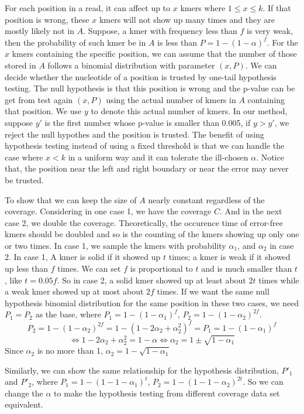 \documentclass[10pt]{article}
\begin{document}
For each position in a read, it can affect up to $x$ kmers where $1\le x\le k$. If that position is wrong, these $x$ kmers will not show up many times and they are mostly likely not in $A$. Suppose, a kmer with frequency less than $f$ is very weak, then the probability of such kmer be in $A$ is less than $P=1-(1-\alpha)^f$. For the $x$ kmers containing the specific position, we can assume that the number of those stored in $A$ follows a binomial distribution with parameter $(x,P)$. We can decide whether the nucleotide of a position is trusted by one-tail hypothesis testing. The null hypothesis is that this position is wrong and the p-value can be get from test again $(x,P)$ using the actual number of kmers in $A$ containing that position. We use $y$ to denote this actual number of kmers. In our method, suppose $y'$ is the first number whose p-value is smaller than 0.005, if $y>y'$, we reject the null hypothes and the position is trusted. The benefit of using hypothesis testing instead of using a fixed threshold is that we can handle the case where $x<k$ in a uniform way and it can tolerate the ill-chosen $\alpha$. Notice that, the position near the left and right boundary or near the error may never be trusted.

To show that we can keep the size of $A$ nearly constant regardless of the coverage. Considering in one case 1, we have the coverage $C$. And in the next case 2, we double the coverage. Theoretically, the occurence time of error-free kmers should be doubled and so is the counting of the kmers showing up only one or two times. In case 1, we sample the kmers with probability $\alpha_1$, and $\alpha_2$ in case 2. In case 1, A kmer is solid if it showed up $t$ times; a kmer is weak if it showed up less than $f$ times. We can set $f$ is proportional to $t$ and is much smaller than $t$, like $t=0.05f$. So in case 2, a solid kmer showed up at least about $2t$ times while a weak kmer showed up at most about $2f$ times. If we want the same null hypothesis binomial distribution for the same position in these two cases, we need $P_1=P_2$ as the base, where $P_1=1-(1-\alpha_1)^f$, $P_2=1-(1-\alpha_2)^{2f}$.
$$P_2=1-(1-\alpha_2)^{2f}=1-(1-2\alpha_2+\alpha_2^2)^f=P_1=1-(1-\alpha_1)^f$$
$$\Leftrightarrow 1-2\alpha_2+\alpha_2^2=1-\alpha \Leftrightarrow \alpha_2=1 \pm \sqrt{1-\alpha_1}$$
Since $\alpha_2$ is no more than 1, $\alpha_2=1-\sqrt{1-\alpha_1}$

Similarly, we can show the same relationship for the hypothesis distribution, $P'_1$ and $P'_2$, where $P_1=1-(1-1-\alpha_1)^t$, $P_2=1-(1-1-\alpha_2)^{2t}$. So we can change the $\alpha$ to make the hypothesis testing from different coverage data set equivalent.
\end{document}
